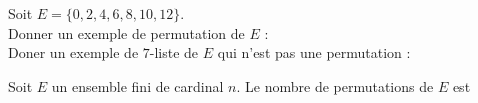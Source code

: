 \documentclass[a4paper, 11pt]{article}
\begin{document}
\begin{exemple}
Soit $E=\lbrace 0,2,4,6,8,10,12\rbrace$. \\
Donner un exemple de permutation de $E$ : \dotfill\\
Doner un exemple de $7$-liste de $E$ qui n'est pas une permutation : \dotfill
\end{exemple}

 


\begin{prop}
Soit $E$ un ensemble fini de cardinal $n$. 
Le nombre de permutations de $E$ est \dotfill \vsec
\end{prop}
 


%
%
%
%
%
%
%
%
%
%
%

\end{document}
